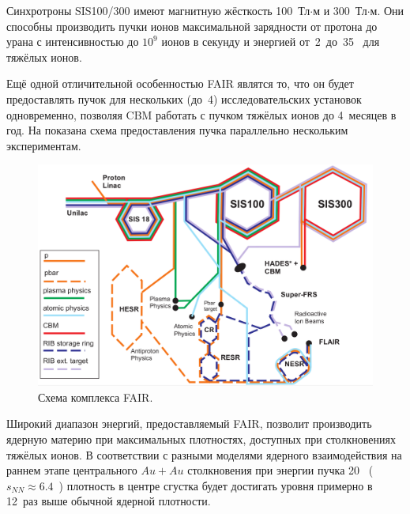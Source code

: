 Синхротроны SIS100/300 имеют магнитную жёсткость 100~Тл$\cdot$м и 300~Тл$\cdot$м. Они способны производить пучки ионов максимальной зарядности от протона до урана с интенсивностью до $10^9$ ионов в секунду и энергией от~2~до~35~\GeVperNucl{} для тяжёлых ионов.


Ещё одной отличительной особенностью FAIR являтся то, что он будет предоставлять пучок для нескольких (до~4) исследовательских установок одновременно, позволяя CBM работать с пучком тяжёлых ионов до 4~месяцев в год. На  показана схема предоставления пучка параллельно нескольким экспериментам.


\begin{figure}[H]
\includegraphics[width=1.0\textwidth]{pictures/FAIR_structure_3.png}
\caption{Схема комплекса FAIR.}
\label{fig:FAIRstructure3}
\end{figure}

Широкий диапазон энергий, предоставляемый FAIR, позволит производить ядерную материю при максимальных плотностях, доступных при столкновениях тяжёлых ионов. В соответствии с разными моделями ядерного взаимодействия на раннем этапе центрального $Au+Au$ столкновения при энергии пучка 20~\GeVperNucl{} ($s_{NN} \approx 6.4$~\GeVperNucl{}) плотность в центре сгустка будет достигать уровня примерно в 12~раз выше обычной ядерной плотности.


